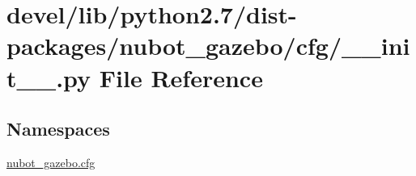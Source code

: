 \hypertarget{devel_2lib_2python2_87_2dist-packages_2nubot__gazebo_2cfg_2____init_____8py}{\section{devel/lib/python2.7/dist-\/packages/nubot\-\_\-gazebo/cfg/\-\_\-\-\_\-init\-\_\-\-\_\-.py File Reference}
\label{devel_2lib_2python2_87_2dist-packages_2nubot__gazebo_2cfg_2____init_____8py}
}
\subsection*{Namespaces}
\begin{DoxyCompactItemize}
\item 
\hyperlink{namespacenubot__gazebo_1_1cfg}{nubot\-\_\-gazebo.\-cfg}
\end{DoxyCompactItemize}
